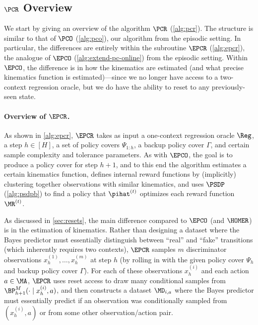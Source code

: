\subsection{$\PCR$ Overview}\label{subsec:pcr-overview}

\colt{}

We start by giving an overview of the algorithm $\PCR$ (\cref{alg:pcr}). The structure is similar to that of $\PCO$ (\cref{alg:pco}), our algorithm from the episodic setting. In particular, the differences are entirely within the subroutine $\EPCR$ (\cref{alg:epcr}), the analogue of $\EPCO$ (\cref{alg:extend-pc-online}) from the episodic setting. Within $\EPCO$, the difference is in how the kinematics are estimated (and what precise kinematics function is estimated)---since we no longer have access to a two-context regression oracle, but we do have the ability to reset to any previously-seen state.

\paragraph{Overview of $\EPCR$.} As shown in \cref{alg:epcr}, $\EPCR$ takes as input a one-context regression oracle $\Reg$, a step $h \in [H]$, a set of policy covers $\Psi_{1:h}$, a backup policy cover $\Gamma$, and certain sample complexity and tolerance parameters. As with $\EPCO$, the goal is to produce a policy cover for step $h+1$, and to this end the algorithm estimates a certain kinematics function, defines internal reward functions by (implicitly) clustering together observations with similar kinematics, and uses $\PSDP$ (\cref{alg:psdpb}) to find a policy that $\pihat^{(t)}$ optimizes each reward function $\MR^{(t)}$.

As discussed in \cref{sec:resets}, the main difference compared to $\EPCO$ (and $\HOMER$) is in the estimation of kinematics. Rather than designing a dataset where the Bayes predictor must essentially distinguish between ``real'' and ``fake'' transitions (which inherently requires two contexts), $\EPCR$ samples $m$ discriminator observations $x_h^{(1)},\dots,x_h^{(m)}$ at step $h$ (by rolling in with the given policy cover $\Psi_h$ and backup policy cover $\Gamma$). For each of these observations $x_h^{(i)}$ and each action $a\in\MA$, $\EPCR$ uses reset access to draw many conditional samples from $\BP^M_{h+1}(\cdot\mid{}x_h^{(i)}, a)$, and then constructs a dataset $\MD_{i,a}$ where the Bayes predictor must essentially predict if an observation was conditionally sampled from $(x_h^{(i)},a)$ or from some other observation/action pair.

